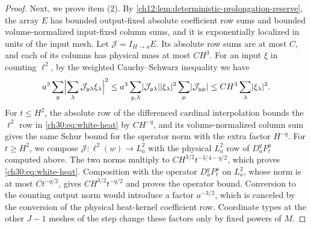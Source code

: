 \begin{proof}
Next, we prove item (2). By \cref{ch12:lem:deterministic-prolongation-reserve}, the array $E$ has bounded output-fixed absolute coefficient row sums and bounded volume-normalized input-fixed column sums, and it is exponentially localized in units of the input mesh. Let $\mathcal J=I_{H\to a}E$. Its absolute row sums are at most $C$, and each of its columns has physical mass at most $CH^3$. For an input $\xi$ in counting $\ell^2$, by the weighted Cauchy--Schwarz inequality we have
\[
 a^3\sum_y\Bigl\lvert\sum_\lambda\mathcal J_{y\lambda}\xi_\lambda\Bigr\rvert^2
 \le a^3\sum_{y,\lambda}\lvert \mathcal J_{y\lambda}\rvert\lvert \xi_\lambda\rvert^2\sum_\mu\lvert \mathcal J_{y\mu}\rvert
 \le CH^3\sum_\lambda\lvert \xi_\lambda\rvert^2 .
\]
For $t\le H^2$, the absolute row of the differenced cardinal interpolation bounds the $\ell^2$ row in \eqref{ch30:eq:white-heat} by $CH^{-q}$, and its volume-normalized column sum gives the same Schur bound for the operator norm with the extra factor $H^{-q}$. For $t\ge H^2$, we compose $\mathcal J\colon\ell^2(w)\to L_a^2$ with the physical $L_a^2$ row of $D_a^qP_t^a$ computed above. The two norms multiply to $CH^{3/2}t^{-3/4-q/2}$, which proves \eqref{ch30:eq:white-heat}. Composition with the operator $D_a^qP_t^a$ on $L_a^2$, whose norm is at most $Ct^{-q/2}$, gives $CH^{3/2}t^{-q/2}$ and proves the operator bound. Conversion to the counting output norm would introduce a factor $a^{-3/2}$, which is canceled by the conversion of the physical heat-kernel coefficient row. Coordinate types at the other $J-1$ meshes of the step change these factors only by fixed powers of $M$.


\end{proof}
